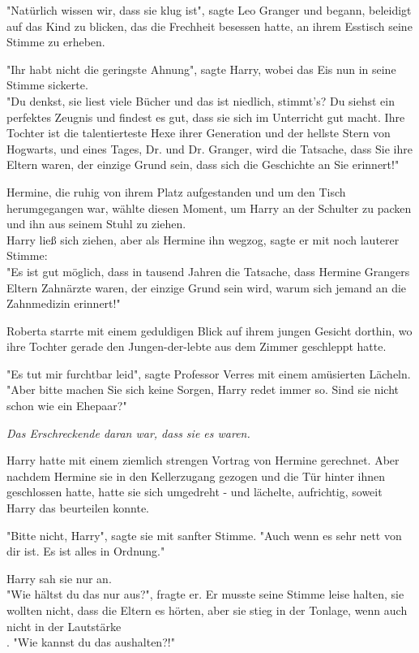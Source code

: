 {"Natürlich wissen wir, dass sie klug ist", sagte Leo Granger und begann, beleidigt auf das Kind zu blicken, das die Frechheit besessen hatte, an ihrem Esstisch seine Stimme zu erheben.

"Ihr habt nicht die geringste Ahnung", sagte Harry, wobei das Eis nun in seine Stimme sickerte.\\ "Du denkst, sie liest viele Bücher und das ist niedlich, stimmt's? Du siehst ein perfektes Zeugnis und findest es gut, dass sie sich im Unterricht gut macht. Ihre Tochter ist die talentierteste Hexe ihrer Generation und der hellste Stern von Hogwarts, und eines Tages, Dr. und Dr. Granger, wird die Tatsache, dass Sie ihre Eltern waren, der einzige Grund sein, dass sich die Geschichte an Sie erinnert!"

Hermine, die ruhig von ihrem Platz aufgestanden und um den Tisch herumgegangen war, wählte diesen Moment, um Harry an der Schulter zu packen und ihn aus seinem Stuhl zu ziehen.\\ Harry ließ sich ziehen, aber als Hermine ihn wegzog, sagte er mit noch lauterer Stimme:\\ "Es ist gut möglich, dass in tausend Jahren die Tatsache, dass Hermine Grangers Eltern Zahnärzte waren, der einzige Grund sein wird, warum sich jemand an die Zahnmedizin erinnert!"

Roberta starrte mit einem geduldigen Blick auf ihrem jungen Gesicht dorthin, wo ihre Tochter gerade den Jungen-der-lebte aus dem Zimmer geschleppt hatte.

"Es tut mir furchtbar leid", sagte Professor Verres mit einem amüsierten Lächeln.\\ "Aber bitte machen Sie sich keine Sorgen, Harry redet immer so. Sind sie nicht schon wie ein Ehepaar?"

\emph{Das Erschreckende daran war, dass sie es waren.}

Harry hatte mit einem ziemlich strengen Vortrag von Hermine gerechnet. Aber nachdem Hermine sie in den Kellerzugang gezogen und die Tür hinter ihnen geschlossen hatte, hatte sie sich umgedreht - und lächelte, aufrichtig, soweit Harry das beurteilen konnte.

"Bitte nicht, Harry", sagte sie mit sanfter Stimme. "Auch wenn es sehr nett von dir ist. Es ist alles in Ordnung."

Harry sah sie nur an.\\ "Wie hältst du das nur aus?", fragte er. Er musste seine Stimme leise halten, sie wollten nicht, dass die Eltern es hörten, aber sie stieg in der Tonlage, wenn auch nicht in der Lautstärke\\ . "Wie kannst du das aushalten?!"

}
